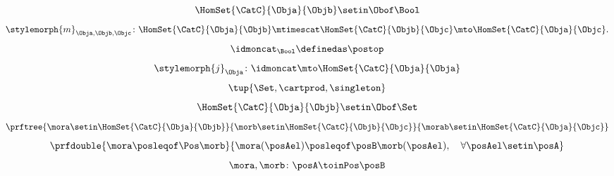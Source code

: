 {\begin{forslides}
\begin{equation}
            \HomSet{\CatC}{\Obja}{\Objb}\setin \Obof\Bool
        \end{equation}
        \begin{equation}
            \label{eq:poset_bool_h}
            \stylemorph{m}_{\Obja,\Objb,\Objc}\colon \HomSet{\CatC}{\Obja}{\Objb}\mtimescat \HomSet{\CatC}{\Objb}{\Objc}\mto \HomSet{\CatC}{\Obja}{\Objc}.
        \end{equation}
        \begin{equation}
            \label{eq:poset_bool_i}
            \idmoncat_{\Bool} \definedas \postop
        \end{equation}
        \begin{equation}
            \label{eq:poset_bool_k}
            \stylemorph{j}_\Obja\colon \idmoncat \mto \HomSet{\CatC}{\Obja}{\Obja}
        \end{equation}
        \begin{equation}
            \label{eq:poset_bool_j}
            \tup{\Set, \cartprod, \singleton}
        \end{equation}
        \begin{equation}
            \label{eq:poset_bool_l}
            \HomSet{\CatC}{\Obja}{\Objb}\setin \Obof\Set
        \end{equation}
        \begin{equation}
            \label{eq:poset_bool_m}
            \prftree{\mora \setin \HomSet{\CatC}{\Obja}{\Objb}}{\morb \setin \HomSet{\CatC}{\Objb}{\Objc}}{{\morab \setin \HomSet{\CatC}{\Obja}{\Objc}}}
        \end{equation}
        \begin{equation}
            \label{eq:poset_pos_a}
            \prfdouble{
                \mora \posleqof\Pos \morb}{\mora(\posAel)\posleqof\posB \morb(\posAel), \quad \forall \posAel \setin \posA}
        \end{equation}
        \begin{equation}
            \label{eq:poset_pos_b}
            \mora,\morb\colon \posA\toinPos \posB
        \end{equation}
    \end{forslides}
}
